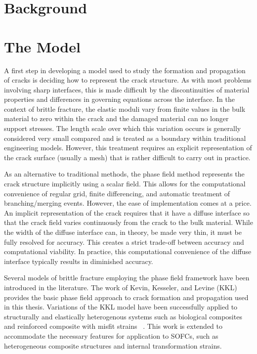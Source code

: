 \section{Background}

\section{The Model}

A first step in developing a model used to study the formation and propagation of cracks is deciding how to represent the crack structure. As with most problems involving sharp interfaces, this is made difficult by the discontinuities of material properties and differences in governing equations across the interface. In the context of brittle fracture, the elastic moduli vary from finite values in the bulk material to zero within the crack and the damaged material can no longer support stresses. The length scale over which this variation occurs is generally considered very small compared and is treated as a boundary within traditional engineering models. However, this treatment requires an explicit representation of the crack surface (usually a mesh) that is rather difficult to carry out in practice. 

As an alternative to traditional methods, the phase field method represents the crack structure implicitly using a scalar field. This allows for the computational convenience of regular grid, finite differencing, and automatic treatment of branching/merging events. However, the ease of implementation comes at a price. An implicit representation of the crack requires that it have a diffuse interface so that the crack field varies continuously from the crack to the bulk material. While the width of the diffuse interface can, in theory, be made very thin, it must be fully resolved for accuracy. This creates a strict trade-off between accuracy and computational viability. In practice, this computational convenience of the diffuse interface typically results in diminished accuracy.  

Several models of brittle fracture employing the phase field framework have been introduced in the literature. The work of Kevin, Kesseler, and Levine (KKL) provides the basic phase field approach to crack formation and propagation used in this thesis. Variations of the KKL model have been successfully applied to structurally and elastically heterogenous systems such as biological composites~\cite{Murali2011} and reinforced composite with misfit strains~\cite{Biner2009} . This work is extended to accommodate the necessary features for application to SOFCs, such as heterogeneous composite structures and internal transformation strains.  
 
